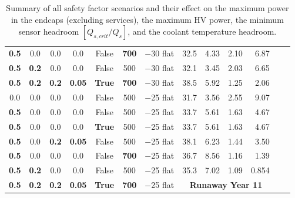 \begin{table}[ht]
\begin{centering}
{\begin{tabular}{|ccccc|cc|rrrr|r|r|}
{\bf 0.5} & 0.0       & 0.0       & 0.0        & False      & {\bf 700} & $-$30 flat &      32.5 &    4.33 &      2.10 &       6.87 \\
{\bf 0.5} & {\bf 0.2} & 0.0       & 0.0        & False      & 500       & $-$30 flat &      32.1 &    3.45 &      2.03 &       6.65 \\
{\bf 0.5} & {\bf 0.2} & {\bf 0.2} & {\bf 0.05} & {\bf True} & {\bf 700} & $-$30 flat &      38.5 &    5.92 &      1.25 &       2.06 \\ \hline
0.0       & 0.0       & 0.0       & 0.0        & False      & 500       & $-$25 flat &      31.7 &    3.56 &      2.55 &       9.07 \\
{\bf 0.5} & 0.0       & 0.0       & 0.0        & False      & 500       & $-$25 flat &      33.7 &    5.61 &      1.63 &       4.67 \\
{\bf 0.5} & 0.0       & 0.0       & 0.0        & {\bf True} & 500       & $-$25 flat &      33.7 &    5.61 &      1.63 &       4.67 \\
{\bf 0.5} & 0.0       & {\bf 0.2} & {\bf 0.05} & False      & 500       & $-$25 flat &      38.1 &    6.23 &      1.44 &       3.50 \\
{\bf 0.5} & 0.0       & 0.0       & 0.0        & False      & {\bf 700} & $-$25 flat &      36.7 &    8.56 &      1.16 &       1.39 \\
{\bf 0.5} & {\bf 0.2} & 0.0       & 0.0        & False      & 500       & $-$25 flat &      35.3 &    7.02 &      1.09 &      0.854 \\
{\bf 0.5} & {\bf 0.2} & {\bf 0.2} & {\bf 0.05} & {\bf True} & {\bf 700} & $-$25 flat & \multicolumn{4}{c|}{\bf Runaway Year 11} \\
\hline\end{tabular}
} %
\caption{Summary of all safety factor scenarios and their effect on the maximum power in the
endcaps (excluding services), the maximum HV power, the minimum sensor headroom $[Q_{s,crit}/Q_s]$, and the coolant temperature headroom.}
\label{detailed_safety_table}
\end{centering}
\end{table}
